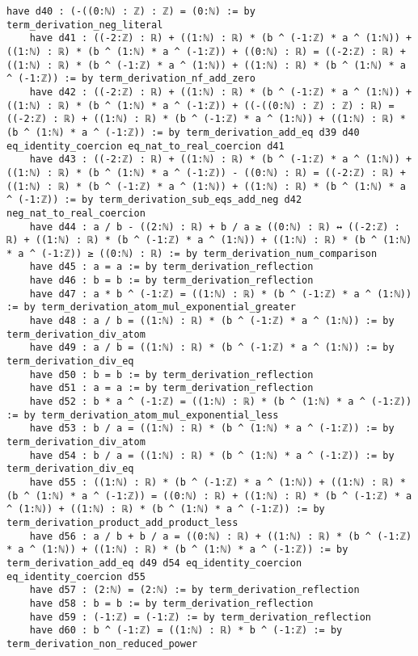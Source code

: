 \documentclass{article}
\begin{document}
\begin{tcolorbox}[colback=white!10, width=\linewidth]
\begin{lstlisting}[language=Lean4]
    have d40 : (-((0:ℕ) : ℤ) : ℤ) = (0:ℕ) := by term_derivation_neg_literal
    have d41 : ((-2:ℤ) : ℝ) + ((1:ℕ) : ℝ) * (b ^ (-1:ℤ) * a ^ (1:ℕ)) + ((1:ℕ) : ℝ) * (b ^ (1:ℕ) * a ^ (-1:ℤ)) + ((0:ℕ) : ℝ) = ((-2:ℤ) : ℝ) + ((1:ℕ) : ℝ) * (b ^ (-1:ℤ) * a ^ (1:ℕ)) + ((1:ℕ) : ℝ) * (b ^ (1:ℕ) * a ^ (-1:ℤ)) := by term_derivation_nf_add_zero
    have d42 : ((-2:ℤ) : ℝ) + ((1:ℕ) : ℝ) * (b ^ (-1:ℤ) * a ^ (1:ℕ)) + ((1:ℕ) : ℝ) * (b ^ (1:ℕ) * a ^ (-1:ℤ)) + ((-((0:ℕ) : ℤ) : ℤ) : ℝ) = ((-2:ℤ) : ℝ) + ((1:ℕ) : ℝ) * (b ^ (-1:ℤ) * a ^ (1:ℕ)) + ((1:ℕ) : ℝ) * (b ^ (1:ℕ) * a ^ (-1:ℤ)) := by term_derivation_add_eq d39 d40 eq_identity_coercion eq_nat_to_real_coercion d41
    have d43 : ((-2:ℤ) : ℝ) + ((1:ℕ) : ℝ) * (b ^ (-1:ℤ) * a ^ (1:ℕ)) + ((1:ℕ) : ℝ) * (b ^ (1:ℕ) * a ^ (-1:ℤ)) - ((0:ℕ) : ℝ) = ((-2:ℤ) : ℝ) + ((1:ℕ) : ℝ) * (b ^ (-1:ℤ) * a ^ (1:ℕ)) + ((1:ℕ) : ℝ) * (b ^ (1:ℕ) * a ^ (-1:ℤ)) := by term_derivation_sub_eqs_add_neg d42 neg_nat_to_real_coercion
    have d44 : a / b - ((2:ℕ) : ℝ) + b / a ≥ ((0:ℕ) : ℝ) ↔ ((-2:ℤ) : ℝ) + ((1:ℕ) : ℝ) * (b ^ (-1:ℤ) * a ^ (1:ℕ)) + ((1:ℕ) : ℝ) * (b ^ (1:ℕ) * a ^ (-1:ℤ)) ≥ ((0:ℕ) : ℝ) := by term_derivation_num_comparison
    have d45 : a = a := by term_derivation_reflection
    have d46 : b = b := by term_derivation_reflection
    have d47 : a * b ^ (-1:ℤ) = ((1:ℕ) : ℝ) * (b ^ (-1:ℤ) * a ^ (1:ℕ)) := by term_derivation_atom_mul_exponential_greater
    have d48 : a / b = ((1:ℕ) : ℝ) * (b ^ (-1:ℤ) * a ^ (1:ℕ)) := by term_derivation_div_atom
    have d49 : a / b = ((1:ℕ) : ℝ) * (b ^ (-1:ℤ) * a ^ (1:ℕ)) := by term_derivation_div_eq
    have d50 : b = b := by term_derivation_reflection
    have d51 : a = a := by term_derivation_reflection
    have d52 : b * a ^ (-1:ℤ) = ((1:ℕ) : ℝ) * (b ^ (1:ℕ) * a ^ (-1:ℤ)) := by term_derivation_atom_mul_exponential_less
    have d53 : b / a = ((1:ℕ) : ℝ) * (b ^ (1:ℕ) * a ^ (-1:ℤ)) := by term_derivation_div_atom
    have d54 : b / a = ((1:ℕ) : ℝ) * (b ^ (1:ℕ) * a ^ (-1:ℤ)) := by term_derivation_div_eq
    have d55 : ((1:ℕ) : ℝ) * (b ^ (-1:ℤ) * a ^ (1:ℕ)) + ((1:ℕ) : ℝ) * (b ^ (1:ℕ) * a ^ (-1:ℤ)) = ((0:ℕ) : ℝ) + ((1:ℕ) : ℝ) * (b ^ (-1:ℤ) * a ^ (1:ℕ)) + ((1:ℕ) : ℝ) * (b ^ (1:ℕ) * a ^ (-1:ℤ)) := by term_derivation_product_add_product_less
    have d56 : a / b + b / a = ((0:ℕ) : ℝ) + ((1:ℕ) : ℝ) * (b ^ (-1:ℤ) * a ^ (1:ℕ)) + ((1:ℕ) : ℝ) * (b ^ (1:ℕ) * a ^ (-1:ℤ)) := by term_derivation_add_eq d49 d54 eq_identity_coercion eq_identity_coercion d55
    have d57 : (2:ℕ) = (2:ℕ) := by term_derivation_reflection
    have d58 : b = b := by term_derivation_reflection
    have d59 : (-1:ℤ) = (-1:ℤ) := by term_derivation_reflection
    have d60 : b ^ (-1:ℤ) = ((1:ℕ) : ℝ) * b ^ (-1:ℤ) := by term_derivation_non_reduced_power

\end{lstlisting}
\end{tcolorbox}
\end{document}
